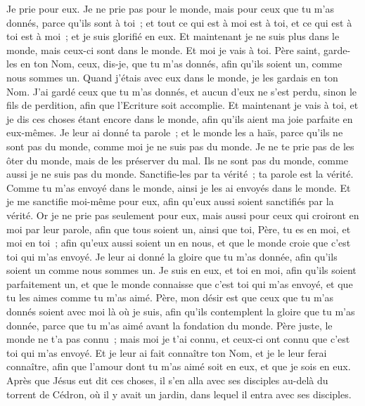 \begin{multicols}{2}
Je prie pour eux. Je ne prie pas pour le monde, mais pour ceux que tu m'as donnés, parce qu'ils sont à toi~;
et tout ce qui est à moi est à toi, et ce qui est à toi est à moi~; et je suis glorifié en eux.
Et maintenant je ne suis plus dans le monde, mais ceux-ci sont dans le monde. Et moi je vais à toi. Père saint, garde-les en ton Nom, ceux, dis-je, que tu m'as donnés, afin qu'ils soient un, comme nous sommes un.
Quand j'étais avec eux dans le monde, je les gardais en ton Nom. J'ai gardé ceux que tu m'as donnés, et aucun d'eux ne s'est perdu, sinon le fils de perdition, afin que l'Ecriture soit accomplie.
Et maintenant je vais à toi, et je dis ces choses étant encore dans le monde, afin qu'ils aient ma joie parfaite en eux-mêmes.
Je leur ai donné ta parole~; et le monde les a haïs, parce qu'ils ne sont pas du monde, comme moi je ne suis pas du monde.
Je ne te prie pas de les ôter du monde, mais de les préserver du mal.
Ils ne sont pas du monde, comme aussi je ne suis pas du monde.
Sanctifie-les par ta vérité~; ta parole est la vérité.
Comme tu m'as envoyé dans le monde, ainsi je les ai envoyés dans le monde.
Et je me sanctifie moi-même pour eux, afin qu'eux aussi soient sanctifiés par la vérité.
Or je ne prie pas seulement pour eux, mais aussi pour ceux qui croiront en moi par leur parole,
afin que tous soient un, ainsi que toi, Père, tu es en moi, et moi en toi~; afin qu'eux aussi soient un en nous, et que le monde croie que c'est toi qui m'as envoyé.
Je leur ai donné la gloire que tu m'as donnée, afin qu'ils soient un comme nous sommes un.
Je suis en eux, et toi en moi, afin qu'ils soient parfaitement un, et que le monde connaisse que c'est toi qui m'as envoyé, et que tu les aimes comme tu m'as aimé.
Père, mon désir est que ceux que tu m'as donnés soient avec moi là où je suis, afin qu'ils contemplent la gloire que tu m'as donnée, parce que tu m'as aimé avant la fondation du monde.
Père juste, le monde ne t'a pas connu~; mais moi je t'ai connu, et ceux-ci ont connu que c'est toi qui m'as envoyé.
Et je leur ai fait connaître ton Nom, et je le leur ferai connaître, afin que l'amour dont tu m'as aimé soit en eux, et que je sois en eux.
\VerseOne{}Après que Jésus eut dit ces choses, il s'en alla avec ses disciples au-delà du torrent de Cédron, où il y avait un jardin, dans lequel il entra avec ses disciples.

\end{multicols}
